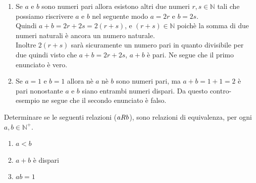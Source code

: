 \begin{soluzione}
    	\begin{enumerate}\setlength\itemsep{1em}
		\item Se $a$ e $b$ sono numeri pari allora esistono altri due numeri $r,s \in \mathbb{N}$ tali che possiamo riscrivere $a$ e $b$ nel seguente modo $a = 2r$ e $b = 2s$.\\
Quindi $ a + b = 2r + 2s = 2(r + s)$, e $(r+s) \in \mathbb{N}$ poichè la somma di due numeri naturali è ancora un numero naturale.\\
Inoltre $2(r+s)$ sarà sicuramente un numero pari in quanto divisibile per due quindi visto che $a+b=2r+2s$, $a+b$ è pari. Ne segue che il primo enunciato è vero.
		
		\item Se $a = 1$ e $b = 1$ allora nè $a$ nè $b$ sono numeri pari, ma $a+b = 1+1 = 2$ è pari nonostante $a$ e $b$ siano entrambi numeri dispari. Da questo contro-esempio ne segue che il secondo enunciato è falso.  
	\end{enumerate}

\end{soluzione}




\begin{esercizio}
    Determinare se le seguenti relazioni ($aR\hspace*{0.01cm}b$), sono relazioni di equivalenza, per ogni $a,\!b \in \mathbb{N}^{+}$. 
	
	\begin{enumerate}\setlength\itemsep{1em}
		\item $a < b$
		\item $a+b$ è dispari
		\item $ab = 1$
	\end{enumerate}
\end{esercizio}


